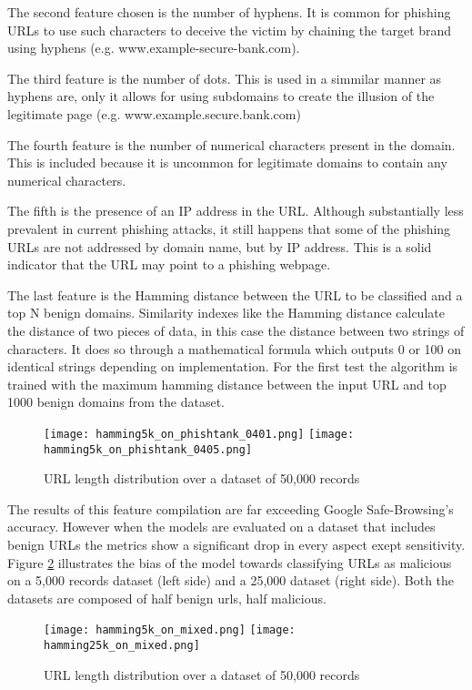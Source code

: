 	The second feature chosen is the number of hyphens. It is common for phishing URLs to use such characters to deceive the victim by chaining the target brand using hyphens (e.g. www.example-secure-bank.com).

	The third feature is the number of dots. This is used in a simmilar manner as hyphens are, only it allows for using subdomains to create the illusion of the legitimate page (e.g. www.example.secure.bank.com)

	The fourth feature is the number of numerical characters present in the domain. This is included because it is uncommon for legitimate domains to contain any numerical characters.

	The fifth is the presence of an IP address in the URL. Although substantially less prevalent in current phishing attacks, it still happens that some of the phishing URLs are not addressed by domain name, but by IP address. This is a solid indicator that the URL may point to a phishing webpage.

	The last feature is the Hamming distance between the URL to be classified and a top N benign domains. Similarity indexes like the Hamming distance calculate the distance of two pieces of data, in this case the distance between two strings of characters. It does so through a mathematical formula which outputs 0 or 100 on identical strings depending on implementation. For the first test the algorithm is trained with the maximum hamming distance between the input URL and top 1000 benign domains from the \cite{MAJESTIC_MILLION} dataset.

	\begin{figure}
		\centering
		\texttt{[image: hamming5k\_on\_phishtank\_0401.png]}
		\texttt{[image: hamming5k\_on\_phishtank\_0405.png]}
		\caption{URL length distribution over a dataset of 50,000 records}
		\label{fig:HAMMING_ON_PHISHTANK}
	\end{figure}

	The results of this feature compilation are far exceeding Google Safe-Browsing's accuracy. However when the models are evaluated on a dataset that includes benign URLs the metrics show a significant drop in every aspect exept sensitivity. Figure \ref{fig:HAMMING_ON_MIXED} illustrates the bias of the model towards classifying URLs as malicious on a 5,000 records dataset (left side) and a 25,000 dataset (right side). Both the datasets are composed of half benign urls, half malicious.

	\begin{figure}[b]
		\centering
		\texttt{[image: hamming5k\_on\_mixed.png]}	\texttt{[image: hamming25k\_on\_mixed.png]}
		\caption{URL length distribution over a dataset of 50,000 records}
		\label{fig:HAMMING_ON_MIXED}
	\end{figure}

